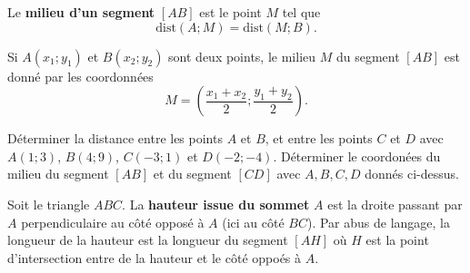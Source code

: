 \documentclass[a4paper,12pt]{report}
\begin{document}
\begin{boiteExT}
    \vspace{4cm}
\end{boiteExT}

\begin{defi}
    Le {\bfseries milieu d'un segment} $[AB]$ est le point $M$ tel que
    \[\text{dist}(A;M)=\text{dist}(M;B).\]
\end{defi}
        
\begin{rem}
    Si $A(x_1;y_1)$ et $B(x_2;y_2)$ sont deux points, le milieu $M$ du segment
    $[AB]$ est donné par les coordonnées
\[M=\left(\dfrac{x_1+x_2}{2};\dfrac{y_1+y_2}{2}\right).\]
\end{rem}
    

\begin{exo}
\begin{tasks}
    \task Déterminer la distance entre les points $A$ et $B$, et entre les points $C$ et $D$ avec $A(1;3)$, $B(4;9)$, $C(-3;1)$ et $D(-2;-4)$. 
    \task Déterminer le coordonées du milieu du segment $[AB]$ et du segment $[CD]$ avec $A, B, C, D$ donnés ci-dessus. 
\end{tasks}
\end{exo}


    
\begin{defi}
    Soit le triangle $ABC$. La {\bfseries hauteur issue du sommet} $A$ est la droite passant par $A$ perpendiculaire au côté opposé à $A$ (ici au côté $BC$). Par abus de langage, la longueur de la hauteur est la longueur du segment $[AH]$ où $H$ est la point d'intersection entre de la hauteur et le côté oppoés à $A$. 
\end{defi}
\end{document}
